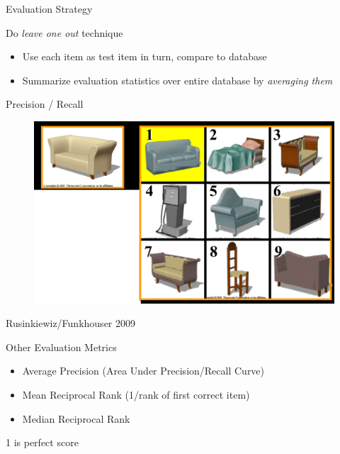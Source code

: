 \documentclass{beamer}
\begin{document}
\begin{frame}{Evaluation Strategy}

Do {\em leave one out} technique

\begin{itemize}

\item Use each item as test item in turn, compare to database

\end{itemize}

\begin{itemize}[label=$\blacktriangleright$]

\item Summarize evaluation statistics over entire database by {\em averaging them}

\end{itemize}

\end{frame}

\begin{frame}{Precision / Recall}

\begin{figure}[t]
	\centering
    \includegraphics[width=\textwidth]{PrecisionRecall.png}
\end{figure}

Rusinkiewiz/Funkhouser 2009

\end{frame}

\begin{frame}{Other Evaluation Metrics}

\begin{itemize}[label=$\vartriangleright$]

\item Average Precision (Area Under Precision/Recall Curve)

\item Mean Reciprocal Rank (1/rank of first correct item)

\item Median Reciprocal Rank

\end{itemize}

1 is perfect score

\end{frame}
\end{document}
